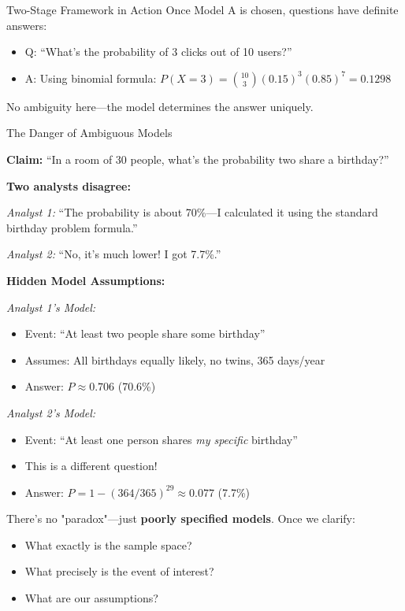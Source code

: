 \begin{itemize}
\begin{exampleboxbreak}{Two-Stage Framework in Action}
Once Model A is chosen, questions have definite answers:
\begin{itemize}
    \item Q: ``What's the probability of 3 clicks out of 10 users?''
    \item A: Using binomial formula: $P(X=3) = \binom{10}{3}(0.15)^3(0.85)^7 = 0.1298$
\end{itemize}

No ambiguity here—the model determines the answer uniquely.

\end{exampleboxbreak}

\begin{exampleboxbreak}{The Danger of Ambiguous Models}


\textbf{Claim:} ``In a room of 30 people, what's the probability two share a birthday?''

\textbf{Two analysts disagree:}

\textit{Analyst 1:} ``The probability is about 70\%—I calculated it using the standard birthday problem formula.''

\textit{Analyst 2:} ``No, it's much lower! I got 7.7\%.''


\textbf{Hidden Model Assumptions:}

\textit{Analyst 1's Model:}
\begin{itemize}
    \item Event: ``At least two people share some birthday''
    \item Assumes: All birthdays equally likely, no twins, 365 days/year
    \item Answer: $P \approx 0.706$ (70.6\%)
\end{itemize}

\textit{Analyst 2's Model:}
\begin{itemize}
    \item Event: ``At least one person shares \textit{my specific} birthday''
    \item This is a different question!
    \item Answer: $P = 1 - (364/365)^{29} \approx 0.077$ (7.7\%)
\end{itemize}


There's no "paradox"—just \textbf{poorly specified models}. Once we clarify:
\begin{itemize}
    \item What exactly is the sample space?
    \item What precisely is the event of interest?
    \item What are our assumptions?
\end{itemize}


\end{exampleboxbreak}
\end{itemize}
